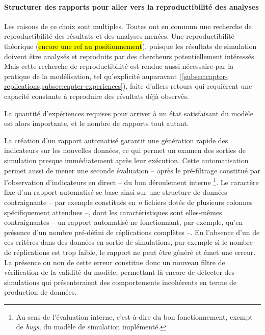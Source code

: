 	\paragraph{Structurer des rapports pour aller vers la reproductibilité des analyses}
	
	Les raisons de ce choix sont multiples. Toutes ont en commun une recherche de reproductibilité des résultats et des analyses menées.
	Une reproductibilité théorique (\hl{encore une ref au positionnement}), puisque les résultats de simulation doivent être analysés et reproduits par des chercheurs potentiellement intéressés.
	Mais cette recherche de reproductibilité est rendue aussi nécessaire par la pratique de la modélisation, tel qu'explicité auparavant (\cref{subsec:capter-replications,subsec:capter-experiences}), faite d'allers-retours qui requièrent une capacité constante à reproduire des résultats déjà observés.
	
	La quantité d'expériences requises pour arriver à un état satisfaisant du modèle est alors importante, et le nombre de rapports tout autant.

	La création d'un rapport automatisé garantit une génération rapide des indicateurs sur les nouvelles données, ce qui permet un examen des sorties de simulation presque immédiatement après leur exécution.
	Cette automatisation permet aussi de mener une seconde évaluation -- après le pré-filtrage constitué par l'observation d'indicateurs en direct -- du bon déroulement \og interne \fg{}\footnote{
		Au sens de l'évaluation interne, c'est-à-dire du bon fonctionnement, exempt de \textit{bugs}, du modèle de simulation implémenté.
	}.
	Le caractère fixe d'un rapport automatisé se base ainsi sur une structure de données contraignante -- par exemple constitués en \textit{n} fichiers dotés de plusieurs colonnes spécifiquement attendues --, dont les caractéristiques sont elles-mêmes contraignantes -- un rapport automatisé ne fonctionnant, par exemple, qu'en présence d'un nombre pré-défini de réplications complètes --.
	En l'absence d'un de ces critères dans des données en sortie de simulations, par exemple si le nombre de réplications est trop faible, le rapport ne peut être généré et émet une erreur.
	La présence ou non de cette erreur constitue donc un nouveau filtre de vérification de la validité du modèle, permettant là encore de détecter des simulations qui présenteraient des comportements incohérents en terme de production de données.

